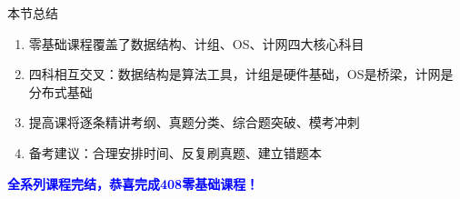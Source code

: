 \documentclass[10pt, aspectratio=169]{beamer}
\begin{document}
\begin{frame}{本节总结}
    \begin{enumerate}
        \item 零基础课程覆盖了数据结构、计组、OS、计网四大核心科目
        \item 四科相互交叉：数据结构是算法工具，计组是硬件基础，OS是桥梁，计网是分布式基础
        \item 提高课将逐条精讲考纲、真题分类、综合题突破、模考冲刺
        \item 备考建议：合理安排时间、反复刷真题、建立错题本
    \end{enumerate}
    \vspace{1em}
    \begin{center}
        \textcolor{blue}{\textbf{全系列课程完结，恭喜完成408零基础课程！}}
    \end{center}
\end{frame}
\end{document}
